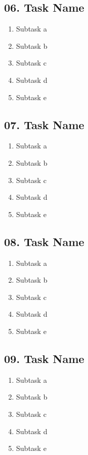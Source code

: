 \documentclass[12pt]{article}
\begin{document}
\subsection*{06. Task Name}
\begin{enumerate}[label=\alph*.]
    \item Subtask a
    \item Subtask b
    \item Subtask c
    \item Subtask d
    \item Subtask e
\end{enumerate}

\subsection*{07. Task Name}
\begin{enumerate}[label=\alph*.]
    \item Subtask a
    \item Subtask b
    \item Subtask c
    \item Subtask d
    \item Subtask e
\end{enumerate}

\subsection*{08. Task Name}
\begin{enumerate}[label=\alph*.]
    \item Subtask a
    \item Subtask b
    \item Subtask c
    \item Subtask d
    \item Subtask e
\end{enumerate}

\subsection*{09. Task Name}
\begin{enumerate}[label=\alph*.]
    \item Subtask a
    \item Subtask b
    \item Subtask c
    \item Subtask d
    \item Subtask e
\end{enumerate}
\end{document}
